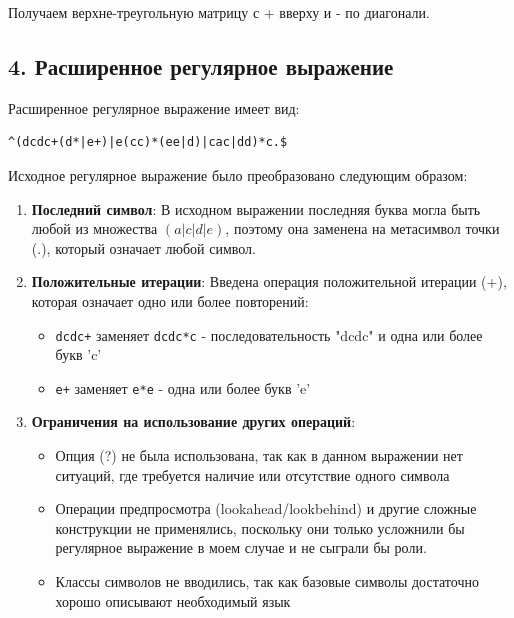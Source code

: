 \documentclass[a4paper,12pt]{article}
\begin{document}
Получаем верхне-треугольную матрицу с + вверху и - по диагонали.

\subsection*{4. Расширенное регулярное выражение}

Расширенное регулярное выражение имеет вид:

\begin{verbatim}
^(dcdc+(d*|e+)|e(cc)*(ee|d)|cac|dd)*c.$
\end{verbatim}

Исходное регулярное выражение было преобразовано следующим образом:

\begin{enumerate}
\item \textbf{Последний символ}: В исходном выражении последняя буква могла быть любой из множества $(a|c|d|e)$, поэтому она заменена на метасимвол точки (.), который означает любой символ.

\item \textbf{Положительные итерации}: Введена операция положительной итерации (+), которая означает одно или более повторений:
\begin{itemize}
\item \texttt{dcdc+} заменяет \texttt{dcdc*c} - последовательность "dcdc" и одна или более букв 'c'
\item \texttt{e+} заменяет \texttt{e*e} - одна или более букв 'e'
\end{itemize}

\item \textbf{Ограничения на использование других операций}:
\begin{itemize}
\item Опция (?) не была использована, так как в данном выражении нет ситуаций, где требуется наличие или отсутствие одного символа
\item Операции предпросмотра (lookahead/lookbehind) и другие сложные конструкции не применялись, поскольку они только усложнили бы регулярное выражение в моем случае и не сыграли бы роли.
\item Классы символов не вводились, так как базовые символы достаточно хорошо описывают необходимый язык
\end{itemize}
\end{enumerate}
\end{document}
